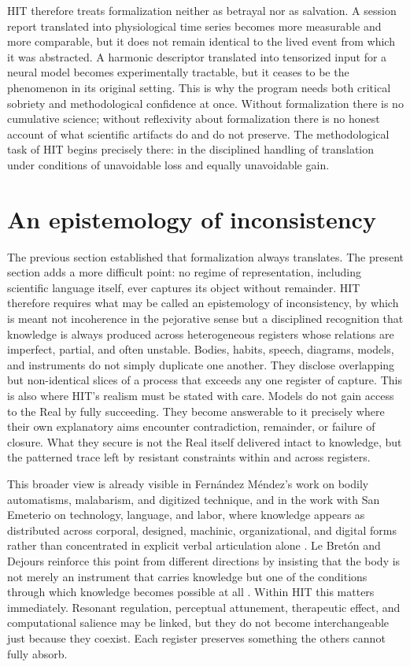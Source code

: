 HIT therefore treats formalization neither as betrayal nor as salvation. A session report translated into physiological time series becomes more measurable and more comparable, but it does not remain identical to the lived event from which it was abstracted. A harmonic descriptor translated into tensorized input for a neural model becomes experimentally tractable, but it ceases to be the phenomenon in its original setting. This is why the program needs both critical sobriety and methodological confidence at once. Without formalization there is no cumulative science; without reflexivity about formalization there is no honest account of what scientific artifacts do and do not preserve. The methodological task of HIT begins precisely there: in the disciplined handling of translation under conditions of unavoidable loss and equally unavoidable gain.

\section{An epistemology of inconsistency}

The previous section established that formalization always translates. The present section adds a more difficult point: no regime of representation, including scientific language itself, ever captures its object without remainder. HIT therefore requires what may be called an epistemology of inconsistency, by which is meant not incoherence in the pejorative sense but a disciplined recognition that knowledge is always produced across heterogeneous registers whose relations are imperfect, partial, and often unstable. Bodies, habits, speech, diagrams, models, and instruments do not simply duplicate one another. They disclose overlapping but non-identical slices of a process that exceeds any one register of capture. This is also where HIT's realism must be stated with care. Models do not gain access to the Real by fully succeeding. They become answerable to it precisely where their own explanatory aims encounter contradiction, remainder, or failure of closure. What they secure is not the Real itself delivered intact to knowledge, but the patterned trace left by resistant constraints within and across registers.

This broader view is already visible in Fern\'andez M\'endez's work on bodily automatisms, malabarism, and digitized technique, and in the work with San Emeterio on technology, language, and labor, where knowledge appears as distributed across corporal, designed, machinic, organizational, and digital forms rather than concentrated in explicit verbal articulation alone \parencite{fernandez_2021a, fernandez_2021b, fernandez_2015, sanemeterio_2017a}. Le Bret\'on and Dejours reinforce this point from different directions by insisting that the body is not merely an instrument that carries knowledge but one of the conditions through which knowledge becomes possible at all \parencite{dejours_1980, le_breton_1995, le_breton_2002}. Within HIT this matters immediately. Resonant regulation, perceptual attunement, therapeutic effect, and computational salience may be linked, but they do not become interchangeable just because they coexist. Each register preserves something the others cannot fully absorb.

